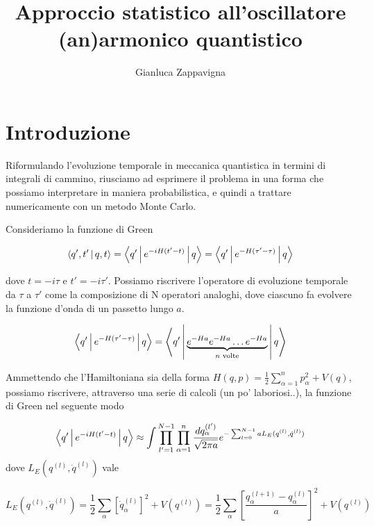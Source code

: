 \documentclass[11pt, a4paper]{article}
\begin{document}
\title{\vspace{-6em}\huge{Approccio statistico all'oscillatore (an)armonico quantistico}\vspace{-2ex}}
\author{Gianluca Zappavigna}
\maketitle

\section{Introduzione}

Riformulando l'evoluzione temporale in meccanica quantistica in termini di integrali di cammino, riusciamo ad esprimere il problema in una forma che possiamo interpretare in maniera probabilistica, e quindi a trattare numericamente con un metodo Monte Carlo.

Consideriamo la funzione di Green

\begin{equation}
  \Braket{q',t' | q,t} = \Braket{q' | e^{-iH(t'-t)} | q} = \Braket{q' | e^{-H(\tau'-\tau)} | q}
\end{equation}

dove $t = -i \tau$ e $t' = -i \tau'$. Possiamo riscrivere l'operatore di evoluzione temporale da $\tau$ a $\tau'$ come la composizione di N operatori analoghi,
dove ciascuno fa evolvere la funzione d'onda di un passetto lungo $a$.

\begin{equation}
  \Braket{q' | e^{-H(\tau'-\tau)} | q} = \Braket{q' | \underbrace{e^{-Ha} e^{-Ha} \ldots e^{-Ha}}_{n \text{ volte}} | q}
\end{equation}

Ammettendo che l'Hamiltoniana sia della forma $H(q, p) =  \frac{1}{2} \sum_{\alpha=1}^{n} p_{\alpha}^2 + V(q)$, possiamo riscrivere, attraverso una serie di calcoli (un po' laboriosi..), la funzione di Green nel seguente modo

\begin{equation}
  \label{green2}
  \Braket{q' | e^{-iH(t'-t)} | q} \approx \int \prod_{l'=1}^{N-1} \prod_{\alpha=1}^n \frac{dq_{\alpha}^{(l')}}{\sqrt{2 \pi a}} e^{-\sum_{l=0}^{N-1} a L_E(q^{(l)}, \dot{q}^{(l)})}
\end{equation}
dove $L_E(q^{(l)}, \dot{q}^{(l)})$ vale

\begin{equation}
  L_E(q^{(l)}, \dot{q}^{(l)}) = \frac{1}{2}\sum_{\alpha} \left[\dot{q}_{\alpha}^{(l)}\right]^2 + V(q^{(l)})
  = \frac{1}{2}\sum_{\alpha} \left[\frac{q_{\alpha}^{(l+1)} - q_{\alpha}^{(l)}}{a}\right]^2 + V(q^{(l)})
\end{equation}
\end{document}
